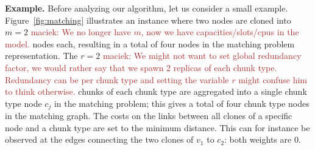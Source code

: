 \documentclass[9pt]{sigcomm-alternate}
\newcommand{\maciek}[1]{\textcolor{brown}{maciek: #1}}
\newcommand{\MaFactor}{m}
\newcommand{\RedundancyFactor}{\ensuremath{r}}
\newcommand{\VmChunkAssignment}{\mu}
\newcommand{\NodeMapping}{\pi}
\newcommand{\VirtualNode}{v}
\newcommand{\achunk}{\ensuremath{c}}
\newcommand{\RS}{\textsc{RS}}
\newcommand{\MA}{\textsc{MA}}
\begin{document}
\textbf{Example.} Before analyzing our algorithm, let us consider a small example.
%
%
%
Figure~\ref{fig:matching} illustrates
an instance where two nodes are
cloned into $\MaFactor = 2$ \maciek{We no longer have $\MaFactor$, now we have capacities/slots/cpus in the model.} nodes each, resulting in a total of four nodes in
the matching problem representation.
The $\RedundancyFactor = 2$ \maciek{We might not want to set global redundancy factor, we would rather say that we spawn 2 replicas of each chunk type. Redundancy can be per chunk type and setting the variable $\RedundancyFactor$ might confuse him to think otherwise.} chunks of each chunk type are
aggregated into a single chunk type node $\achunk_j$  in the matching problem;
this gives a total of four chunk type nodes in the matching graph. The costs
on the links between all clones of a specific node and a chunk type are set to
the minimum distance. This can for instance be observed at the edges connecting
the two clones of $\VirtualNode_1$ to $\achunk_2$: both weights are 0.
\end{document}
